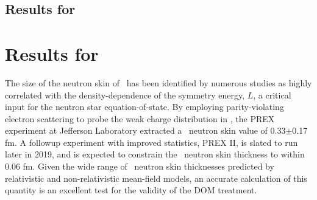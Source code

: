 \subsection{Results for \snFour}

\section{Results for \pbEight}
The size of the neutron skin of \pbEight\ has been identified by numerous studies as highly
correlated with the density-dependence of the symmetry energy, $L$, a critical input for the neutron
star equation-of-state. By employing parity-violating electron scattering to probe the
weak charge distribution in \pbEight, the PREX experiment at Jefferson Laboratory extracted a
\pbEight\ neutron skin value of 0.33$\pm$0.17 fm. A followup experiment with improved statistics, PREX II,
is slated to run later in 2019, and is expected to constrain the \pbEight\ neutron skin thickness to
within 0.06 fm. Given the wide range of \pbEight\ neutron skin thicknesses predicted by relativistic
and non-relativistic mean-field models, an accurate calculation of this quantity is an excellent
test for the validity of the DOM treatment.

